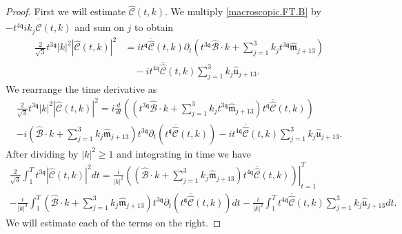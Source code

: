 \documentclass[reqno]{amsart}
\newcommand{\qq}{\mathfrak{q}}
\newcommand{\tq}{t^{\qq}}
\newcommand{\tTq}{t^{3\qq}}
\theoremstyle{definition}
\numberwithin{equation}{section}
\numberwithin{theorem}{section}
\begin{document}
\begin{proof}
 

First we will estimate $\widehat{\mathcal{C}}(t,k)$. We multiply \eqref{macroscopic.FT.B} by $-t^{4\qq} ik_j  \overline{\widehat{\mathcal{C}}}(t,k)$ and sum on $j$ to obtain
\begin{align*}
 \frac{2}{\sqrt{3}}\tTq |k|^2   \left|\widehat{\mathcal{C}}(t,k)\right|^2
& =   i \tq\overline{\widehat{\mathcal{C}}}(t,k)\partial_t \left(\tTq \widehat{\mathcal{B}}\cdot k +\sum_{j=1}^3 k_j   \tTq \widehat{\mathfrak{m}}_{j+13} \right)
\\
& \quad -
i t^{4\qq}\overline{\widehat{\mathcal{C}}}(t,k)  \sum_{j=1}^3 k_j\hat{\mathfrak{u}}_{j+13} .
\end{align*}
We rearrange the time derivative as
\begin{multline*}
 \frac{2}{\sqrt{3}}\tTq |k|^2   \left|\widehat{\mathcal{C}}(t,k)\right|^2
=   i \frac{d}{dt} \left( \left(\tTq \widehat{\mathcal{B}}\cdot k +\sum_{j=1}^3 k_j   \tTq \widehat{\mathfrak{m}}_{j+13} \right)\tq\overline{\widehat{\mathcal{C}}}(t,k) \right)
\\
-
i  \left( \widehat{\mathcal{B}}\cdot k +\sum_{j=1}^3 k_j    \widehat{\mathfrak{m}}_{j+13} \right) \tTq\partial_t  \left(\tq\overline{\widehat{\mathcal{C}}}(t,k)\right)
-
i t^{4\qq}\overline{\widehat{\mathcal{C}}}(t,k)  \sum_{j=1}^3 k_j\hat{\mathfrak{u}}_{j+13} .
\end{multline*}
After dividing by $|k|^2 \ge 1$ and integrating in time we have
\begin{multline*}
 \frac{2}{\sqrt{3}}\int_1^{T} \tTq|\widehat{\mathcal{C}}(t,k)|^2  dt
=
\left. \frac{i}{|k|^2} \left( \left( \widehat{\mathcal{B}}\cdot k +\sum_{j=1}^3 k_j    \widehat{\mathfrak{m}}_{j+13} \right)t^{4\qq}\overline{\widehat{\mathcal{C}}}(t,k) \right)\right|_{t=1}^T
\\
-
\frac{i}{|k|^2} \int_1^{T} \left( \widehat{\mathcal{B}}\cdot k +\sum_{j=1}^3 k_j    \widehat{\mathfrak{m}}_{j+13} \right) \tTq\partial_t  \left(\tq\overline{\widehat{\mathcal{C}}}(t,k)\right) dt
-
\frac{i}{|k|^2} \int_1^{T}t^{4\qq}\overline{\widehat{\mathcal{C}}}(t,k)  \sum_{j=1}^3 k_j\hat{\mathfrak{u}}_{j+13} dt.
\end{multline*}
We will estimate each of the terms on the right.  




\end{proof}
\end{document}
